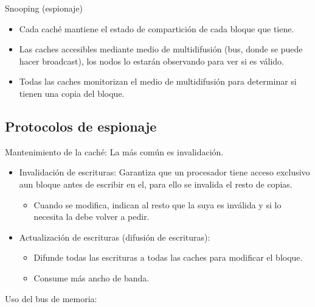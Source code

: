 \documentclass[12pt, twoside, openright]{report} %
\begin{document}
Snooping (espionaje)

\begin{itemize}

	\item Cada caché mantiene el estado de compartición de cada bloque
	      que tiene.
	\item Las caches accesibles mediante medio de multidifusión (bus,
	      donde se puede hacer broadcast), los nodos lo estarán
	      observando para ver si es válido.
	\item Todas las caches monitorizan el medio de multidifusión para
	      determinar si tienen una copia del bloque.
\end{itemize}


\subsection{Protocolos de espionaje}



Mantenimiento de la caché: La más común es invalidación.

\begin{itemize}

	\item Invalidación de escrituras: Garantiza que un procesador tiene
	      acceso exclusivo aun bloque antes de escribir en el, para ello
	      se invalida el resto de copias.

	      \begin{itemize}

		      \item Cuando se modifica, indican al resto que la suya es inválida y
		            si lo necesita la debe volver a pedir.
	      \end{itemize}
	\item Actualización de escrituras (difusión de escrituras):

	      \begin{itemize}

		      \item Difunde todas las escrituras a todas las caches para modificar
		            el bloque.
		      \item Consume más ancho de banda.
	      \end{itemize}
\end{itemize}

Uso del bus de memoria:
\end{document}
